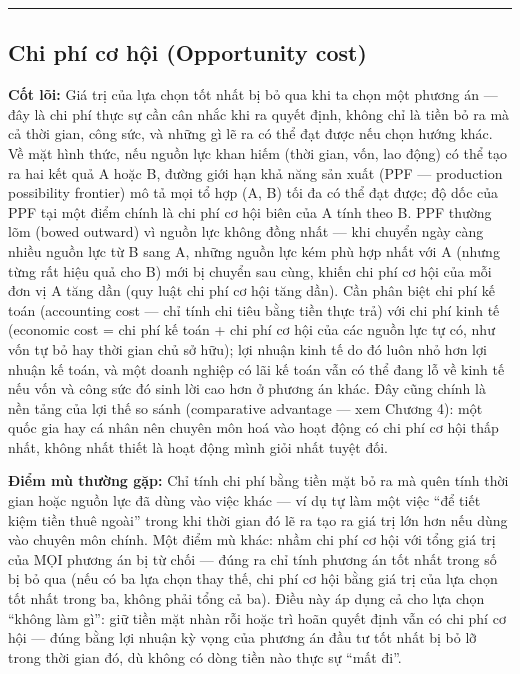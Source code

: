 \documentclass[
]{article}
\begin{document}
\begin{center}\rule{0.5\linewidth}{0.5pt}\end{center}

\subsection{Chi phí cơ hội (Opportunity
cost)}\label{chi-phuxed-cux1a1-hux1ed9i-opportunity-cost}

\textbf{Cốt lõi:} Giá trị của lựa chọn tốt nhất bị bỏ qua khi ta chọn
một phương án --- đây là chi phí thực sự cần cân nhắc khi ra quyết định,
không chỉ là tiền bỏ ra mà cả thời gian, công sức, và những gì lẽ ra có
thể đạt được nếu chọn hướng khác. Về mặt hình thức, nếu nguồn lực khan
hiếm (thời gian, vốn, lao động) có thể tạo ra hai kết quả A hoặc B,
đường giới hạn khả năng sản xuất (PPF --- production possibility
frontier) mô tả mọi tổ hợp (A, B) tối đa có thể đạt được; độ dốc của PPF
tại một điểm chính là chi phí cơ hội biên của A tính theo B. PPF thường
lõm (bowed outward) vì nguồn lực không đồng nhất --- khi chuyển ngày
càng nhiều nguồn lực từ B sang A, những nguồn lực kém phù hợp nhất với A
(nhưng từng rất hiệu quả cho B) mới bị chuyển sau cùng, khiến chi phí cơ
hội của mỗi đơn vị A tăng dần (quy luật chi phí cơ hội tăng dần). Cần
phân biệt chi phí kế toán (accounting cost --- chỉ tính chi tiêu bằng
tiền thực trả) với chi phí kinh tế (economic cost = chi phí kế toán +
chi phí cơ hội của các nguồn lực tự có, như vốn tự bỏ hay thời gian chủ
sở hữu); lợi nhuận kinh tế do đó luôn nhỏ hơn lợi nhuận kế toán, và một
doanh nghiệp có lãi kế toán vẫn có thể đang lỗ về kinh tế nếu vốn và
công sức đó sinh lời cao hơn ở phương án khác. Đây cũng chính là nền
tảng của lợi thế so sánh (comparative advantage --- xem Chương 4): một
quốc gia hay cá nhân nên chuyên môn hoá vào hoạt động có chi phí cơ hội
thấp nhất, không nhất thiết là hoạt động mình giỏi nhất tuyệt đối.

\textbf{Điểm mù thường gặp:} Chỉ tính chi phí bằng tiền mặt bỏ ra mà
quên tính thời gian hoặc nguồn lực đã dùng vào việc khác --- ví dụ tự
làm một việc ``để tiết kiệm tiền thuê ngoài'' trong khi thời gian đó lẽ
ra tạo ra giá trị lớn hơn nếu dùng vào chuyên môn chính. Một điểm mù
khác: nhầm chi phí cơ hội với tổng giá trị của MỌI phương án bị từ chối
--- đúng ra chỉ tính phương án tốt nhất trong số bị bỏ qua (nếu có ba
lựa chọn thay thế, chi phí cơ hội bằng giá trị của lựa chọn tốt nhất
trong ba, không phải tổng cả ba). Điều này áp dụng cả cho lựa chọn
``không làm gì'': giữ tiền mặt nhàn rỗi hoặc trì hoãn quyết định vẫn có
chi phí cơ hội --- đúng bằng lợi nhuận kỳ vọng của phương án đầu tư tốt
nhất bị bỏ lỡ trong thời gian đó, dù không có dòng tiền nào thực sự
``mất đi''.
\end{document}
